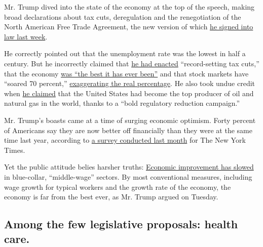 Mr. Trump dived into the state of the economy at the top of the speech,
making broad declarations about tax cuts, deregulation and the
renegotiation of the North American Free Trade Agreement, the new
version of which
\href{https://www.nytimes3xbfgragh.onion/2020/01/29/business/economy/usmca-trump.html}{he
signed into law last week}.

He correctly pointed out that the unemployment rate was the lowest in
half a century. But he incorrectly claimed that
\href{https://www.nytimes3xbfgragh.onion/live/2020/fact-check-state-of-the-union-02-04\#from-the-instant-i-took-office-i-moved-rapidly-to-revive-the-us-economy-slashing-a-record-number-of-job-killing-regulations-enac}{he
had enacted} ``record-setting tax cuts,'' that the economy
\href{https://www.nytimes3xbfgragh.onion/live/2020/fact-check-state-of-the-union-02-04\#our-economy-is-the-best-it-has-ever-been}{was
``the best it has ever been''} and that stock markets have ``soared 70
percent,''
\href{https://www.nytimes3xbfgragh.onion/live/2020/fact-check-state-of-the-union-02-04\#since-my-election-us-stock-markets-have-soared-70-percent-adding-more-than-12-trillion-to-our-nations-wealth-transcending-anythi}{exaggerating
the real percentage}. He also took undue credit when
\href{https://www.nytimes3xbfgragh.onion/live/2020/fact-check-state-of-the-union-02-04\#thanks-to-our-bold-regulatory-reduction-campaign-the-united-states-has-become-the-no-1-producer-of-oil-and-natural-gas-anywhere-}{he
claimed} that the United States had become the top producer of oil and
natural gas in the world, thanks to a ``bold regulatory reduction
campaign.''

Mr. Trump's boasts came at a time of surging economic optimism. Forty
percent of Americans say they are now better off financially than they
were at the same time last year, according to
\href{https://www.surveymonkey.com/curiosity/nyt-january-2020-cci/}{a
survey conducted last month} for The New York Times.

Yet the public attitude belies harsher truths:
\href{https://www.nytimes3xbfgragh.onion/2020/02/04/business/economy/trump-economy-state-of-the-union.html}{Economic
improvement has slowed} in blue-collar, ``middle-wage'' sectors. By most
conventional measures, including wage growth for typical workers and the
growth rate of the economy, the economy is far from the best ever, as
Mr. Trump argued on Tuesday.

\hypertarget{among-the-few-legislative-proposals-health-care}{%
\subsection{Among the few legislative proposals: health
care.}\label{among-the-few-legislative-proposals-health-care}}

